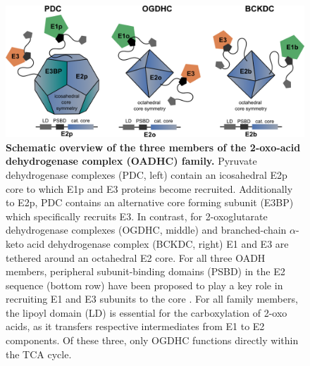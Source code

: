 \begin{figure}[t!]
    \centering
    \includegraphics[]{Chapter.5/Figures/Figure1.png}
    \caption{\textbf{Schematic overview of the three members of the 2-oxo-acid dehydrogenase complex (OADHC) family.} Pyruvate dehydrogenase complexes (PDC, left) contain an icosahedral E2p core to which E1p and E3 proteins become recruited. Additionally to E2p, PDC contains an alternative core forming subunit (E3BP) which specifically recruits E3. In contrast, for 2-oxoglutarate dehydrogenase complexes (OGDHC, middle) and branched-chain $\alpha$-keto acid dehydrogenase complex (BCKDC, right) E1 and E3 are tethered around an octahedral E2 core. For all three OADH members, peripheral subunit-binding domains (PSBD) in the E2 sequence (bottom row) have been proposed to play a key role in recruiting E1 and E3 subunits to the core \cite{Perham_2000}. For all family members, the lipoyl domain (LD) is essential for the carboxylation of 2-oxo acids, as it transfers respective intermediates from E1 to E2 components. Of these three, only OGDHC functions directly within the TCA cycle.}
    \label{fig:ch5_fig1}
\end{figure}
